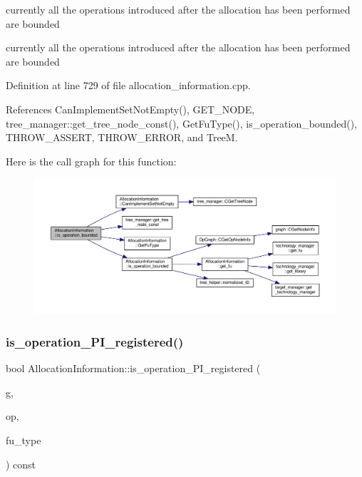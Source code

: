 currently all the operations introduced after the allocation has been performed are bounded

currently all the operations introduced after the allocation has been performed are bounded 

Definition at line 729 of file allocation\+\_\+information.\+cpp.



References Can\+Implement\+Set\+Not\+Empty(), G\+E\+T\+\_\+\+N\+O\+DE, tree\+\_\+manager\+::get\+\_\+tree\+\_\+node\+\_\+const(), Get\+Fu\+Type(), is\+\_\+operation\+\_\+bounded(), T\+H\+R\+O\+W\+\_\+\+A\+S\+S\+E\+RT, T\+H\+R\+O\+W\+\_\+\+E\+R\+R\+OR, and TreeM.

Here is the call graph for this function\+:
\nopagebreak
\begin{figure}[H]
\begin{center}
\leavevmode
\includegraphics[width=350pt]{d7/d79/classAllocationInformation_a852be192e7a71d94c235d38dfc3dd96d_cgraph}
\end{center}
\end{figure}
\mbox{\label{classAllocationInformation_a669fe3fcd55c57ac188cb0651a4117c0}} 
\subsubsection{\texorpdfstring{is\+\_\+operation\+\_\+\+P\+I\+\_\+registered()}{is\_operation\_PI\_registered()}\hspace{0.1cm}{\footnotesize\ttfamily [1/3]}}
{\footnotesize\ttfamily bool Allocation\+Information\+::is\+\_\+operation\+\_\+\+P\+I\+\_\+registered (\begin{DoxyParamCaption}\item[{const \hyperlink{op__graph_8hpp_a9a0b240622c47584bee6951a6f5de746}{Op\+Graph\+Const\+Ref}}]{g,  }\item[{const \hyperlink{graph_8hpp_abefdcf0544e601805af44eca032cca14}{vertex} \&}]{op,  }\item[{unsigned int}]{fu\+\_\+type }\end{DoxyParamCaption}) const}



